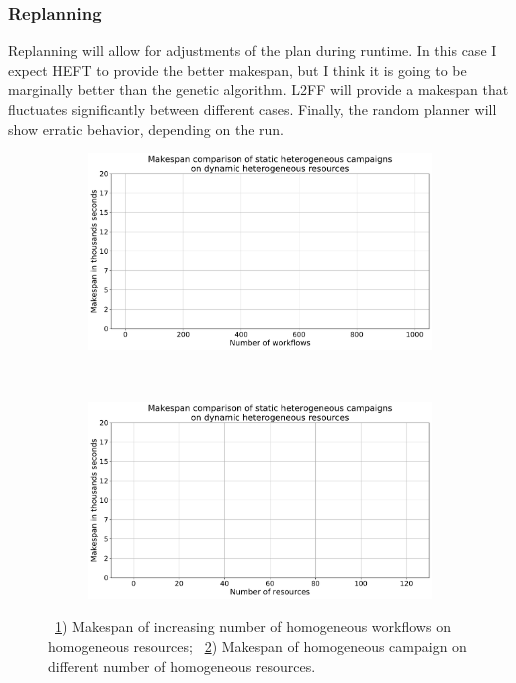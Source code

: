\subsubsection{Replanning}

Replanning will allow for adjustments of the plan during runtime.
In this case I expect HEFT to provide the better makespan, but I think it is going to be marginally better than the genetic algorithm. 
L2FF will provide a makespan that fluctuates significantly between different cases.
Finally, the random planner will show erratic behavior, depending on the run.

\begin{figure}[ht!]
    \centering
    \begin{subfigure}[b]{0.45\textwidth}
        \includegraphics[width=.95\textwidth]{figures/campaign/StHeteroCampaigns_4DyHeteroResources.pdf}
        \caption{}
        \label{fig:StHeteroCampaigns_4DyHeteroResourcesRP}
    \end{subfigure}%
    ~ 
    \begin{subfigure}[b]{0.45\textwidth}
        \includegraphics[width=\linewidth]{figures/campaign/DyHeteroResources_StHeteroCampaigns.pdf}
        \caption{}
        \label{fig:DyHeteroResources_StHeteroCampaignsRP}
    \end{subfigure}
    \caption{~\ref{fig:StHeteroCampaigns_4DyHeteroResourcesRP}) Makespan of increasing number of homogeneous workflows on homogeneous resources;
        ~\ref{fig:DyHeteroResources_StHeteroCampaignsRP}) Makespan of homogeneous campaign on different number of homogeneous resources.}
    \label{fig:erplan_homog_analysis}
\end{figure}

